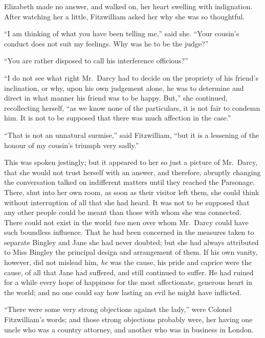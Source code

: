 \documentclass[12pt,english,oneside]{book}
\begin{document}
Elizabeth made no answer, and walked on, her heart swelling with indignation.
After watching her a little, Fitzwilliam asked her why she was so
thoughtful.

{}``I am thinking of what you have been telling me,'' said she.
{}``Your cousin's conduct does not suit my feelings. Why was he to
be the judge?''\ 

{}``You are rather disposed to call his interference officious?''\ 

{}``I do not see what right Mr.\ Darcy had to decide on the propriety
of his friend's inclination, or why, upon his own judgement alone,
he was to determine and direct in what manner his friend was to be
happy. But,'' she continued, recollecting herself, {}``as we know
none of the particulars, it is not fair to condemn him. It is not
to be supposed that there was much affection in the case.''

{}``That is not an unnatural surmise,'' said Fitzwilliam, {}``but
it is a lessening of the honour of my cousin's triumph very sadly.''

This was spoken jestingly; but it appeared to her so just a picture
of Mr.\ Darcy, that she would not trust herself with an answer, and
therefore, abruptly changing the conversation talked on indifferent
matters until they reached the Parsonage. There, shut into her own
room, as soon as their visitor left them, she could think without
interruption of all that she had heard. It was not to be supposed
that any other people could be meant than those with whom she was
connected. There could not exist in the world \textit{two} men over
whom Mr.\ Darcy could have such boundless influence. That he had
been concerned in the measures taken to separate Bingley and Jane
she had never doubted; but she had always attributed to Miss Bingley
the principal design and arrangement of them. If his own vanity, however,
did not mislead him, \textit{he} was the cause, his pride and caprice
were the cause, of all that Jane had suffered, and still continued
to suffer. He had ruined for a while every hope of happiness for the
most affectionate, generous heart in the world; and no one could say
how lasting an evil he might have inflicted.

{}``There were some very strong objections against the lady,'' were
Colonel Fitzwilliam's words; and those strong objections probably
were, her having one uncle who was a country attorney, and another
who was in business in London.
\end{document}
